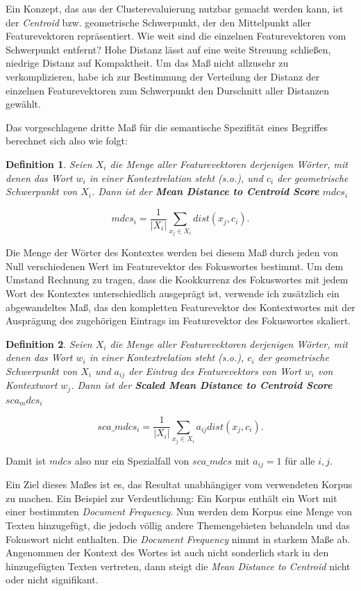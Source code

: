 \documentclass[11pt,numbers=noenddot]{scrartcl}
\newtheorem*{defi}{Definition}
\begin{document}
Ein Konzept, das aus der Clusterevaluierung nutzbar gemacht werden kann, ist der \emph{Centroid} bzw. geometrische Schwerpunkt, der den Mittelpunkt aller Featurevektoren repräsentiert. Wie weit sind die einzelnen Featurevektoren vom Schwerpunkt entfernt? Hohe Distanz lässt auf eine weite Streuung schließen, niedrige Distanz auf Kompaktheit. Um das Maß nicht allzusehr zu verkomplizieren, habe ich zur Bestimmung der Verteilung der Distanz der einzelnen Featurevektoren zum Schwerpunkt den Durschnitt aller Distanzen gewählt.

Das vorgeschlagene dritte Maß für die semantische Spezifität eines Begriffes berechnet sich also wie folgt:

\begin{defi}
Seien $X_i$ die Menge aller Featurevektoren derjenigen Wörter, mit denen das Wort $w_i$ in einer Kontextrelation steht (s.o.), und $c_i$ der geometrische Schwerpunkt von $X_i$. Dann ist der \textbf{Mean Distance to Centroid Score} $mdcs_i$

\begin{equation}
   mdcs_i =  \frac{1}{|X_i|} \sum_{x_j \in X_i} dist(x_j, c_i).
\end{equation}
\end{defi}

Die Menge der Wörter des Kontextes werden bei diesem Maß durch jeden von Null verschiedenen Wert im Featurevektor des Fokuswortes bestimmt. Um dem Umstand Rechnung zu tragen, dass die Kookkurrenz des Fokuswortes mit jedem Wort des Kontextes unterschiedlich ausgeprägt ist, verwende ich zusätzlich ein abgewandeltes Maß, das den kompletten Featurevektor des Kontextwortes mit der Ausprägung des zugehörigen Eintrags im Featurevektor des Fokuswortes skaliert.

\begin{defi}
Seien $X_i$ die Menge aller Featurevektoren derjenigen Wörter, mit denen das Wort $w_i$ in einer Kontextrelation steht (s.o.), $c_i$ der geometrische Schwerpunkt von $X_i$ und $a_{ij}$ der Eintrag des Featurevektors von Wort $w_i$ von Kontextwort $w_j$. Dann ist der \textbf{Scaled Mean Distance to Centroid Score} $sca_mdcs_i$


$$
  sca\_mdcs_i =  \frac{1}{|X_i|} \sum_{x_j \in X_i}  a_{ij} dist(x_j, c_i).
$$

\end{defi}

Damit ist $mdcs$ also nur ein Spezialfall von $sca\_mdcs$ mit $a_{ij} = 1$ für alle $i,j$.

Ein Ziel dieses Maßes ist es, das Resultat unabhängiger vom verwendeten Korpus zu machen. Ein Beispiel zur Verdeutlichung: Ein Korpus enthält ein Wort mit einer bestimmten \emph{Document Frequency}. Nun werden dem Korpus eine Menge von Texten hinzugefügt, die jedoch völlig andere Themengebieten behandeln und das Fokuswort nicht enthalten. Die \emph{Document Frequency} nimmt in starkem Maße ab. Angenommen der Kontext des Wortes ist auch nicht sonderlich stark in den hinzugefügten Texten vertreten, dann steigt die \emph{Mean Distance to Centroid} nicht oder nicht signifikant. 
\end{document}
